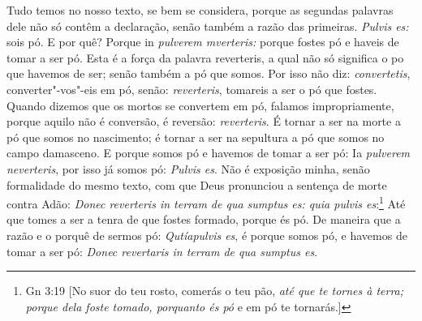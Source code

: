Tudo temos no nosso texto, se bem se considera, porque as segundas
palavras dele não só contêm a declaração, senão também a razão das
primeiras. \emph{Pulvis es:} sois pó. E por quê? Porque in
\emph{pulverem mverteris:} porque fostes pó e haveis de tomar a ser pó.
Esta é a força da palavra reverteris, a qual não só significa o po que
havemos de ser; senão também a pó que somos. Por isso não diz:
\emph{convertetis}, converter"-vos"-eis em pó, senão: \emph{reverteris},
tomareis a ser o pó que fostes. Quando dizemos que os mortos se
convertem em pó, falamos impropriamente, porque aquilo não é conversão,
é reversão: \emph{reverteris}. É tornar a ser na morte a pó que somos no
nascimento; é tornar a ser na sepultura a pó que somos no campo
damasceno. E porque somos pó e havemos de tomar a ser pó: Ia
\emph{pulverem neverteris}, por isso já somos pó: \emph{Pulvis es}.
Não é exposição minha, senão formalidade do mesmo texto, com que Deus
pronunciou a sentença de morte contra Adão: \emph{Donec reverteris in
terram de qua sumptus es: quia pulvis es}:\footnote{Gn 3:19 [No suor do teu rosto, comerás o teu pão, \emph{até que te tornes à terra; porque dela foste
tomado, porquanto és pó} e em pó te tornarás.]} Até que tomes
a ser a tenra de que fostes formado, porque és pó. De maneira que a
razão e o porquê de sermos pó: \emph{Qutíapulvis es}, é porque somos pó,
e havemos de tomar a ser pó: \emph{Donec revertaris in terram de qua
sumptus es}.


